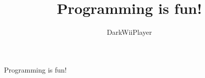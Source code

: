 \documentclass{article}
\title{Programming is fun!}
\author{DarkWiiPlayer}
\begin{document}
\maketitle
Programming is fun! \cite{sicp}


\end{document}
